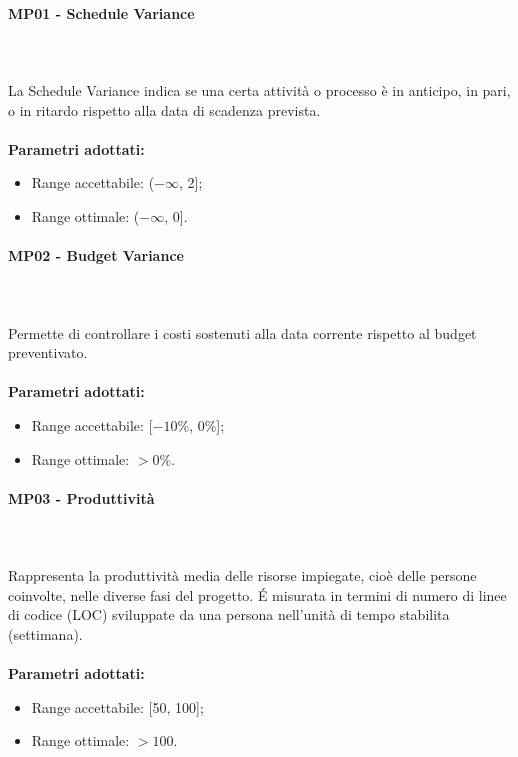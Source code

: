 \paragraph{MP01 - Schedule Variance} \mbox{} \\ \mbox{} \\
La Schedule Variance indica se una certa attività o processo è in anticipo, in pari, o in ritardo rispetto alla data di scadenza prevista. \\ \\ 
\textbf{Parametri adottati:} 
\begin{itemize}
\item Range accettabile: ($ -\infty $, 2];
\item Range ottimale: ($ -\infty $, 0].
\end{itemize}

\paragraph{MP02 - Budget Variance} \mbox{} \\ \mbox{} \\
Permette di controllare i costi sostenuti alla data corrente rispetto al budget preventivato. \\ \\ 
\textbf{Parametri adottati:}  
\begin{itemize}
\item Range accettabile: [$-10\%$, $0\%$]; 
\item Range ottimale: $ > 0\%$.
\end{itemize}

\paragraph{MP03 - Produttività} \mbox{} \\ \mbox{} \\
Rappresenta la produttività media delle risorse impiegate, cioè delle persone coinvolte, nelle diverse fasi del progetto. \'E misurata in termini di numero di linee di codice (LOC) sviluppate da una persona
nell’unità di tempo stabilita (settimana).\\ \\ 
\textbf{Parametri adottati:} 
\begin{itemize}
	\item Range accettabile: [50, 100];
	\item Range ottimale: $ > 100$.
\end{itemize}



